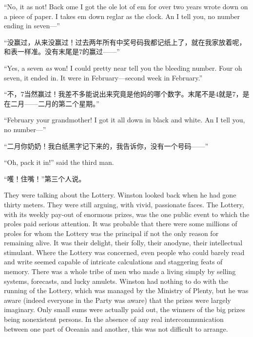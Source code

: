 \begin{paracol}{2}
``No, it \textquotesingle as not! Back \textquotesingle ome I got the
\textquotesingle ole lot of \textquotesingle em for over two years wrote
down on a piece of paper. I takes \textquotesingle em down
reg\textquotesingle lar as the clock. An\textquotesingle{} I tell you,
no number ending in seven---''

\switchcolumn

``没赢过，从来没赢过！过去两年所有中奖号码我都记纸上了，就在我家放着呢，和表一样准。没有末尾是7的赢过——''

\switchcolumn*

``Yes, a seven \emph{\textquotesingle as} won! I could pretty near tell
you the bleeding number. Four oh seven, it ended in. It were in
February---second week in February.''

\switchcolumn

``不，7当然赢过！我差不多能说出来究竟是他妈的哪个数字。末尾不是4就是7，是在二月——二月的第二个星期。''

\switchcolumn*

``February your grandmother! I got it all down in black and white.
An\textquotesingle{} I tell you, no number---''

\switchcolumn

``二月你奶奶！我白纸黑字记下来的，我告诉你，没有一个号码——''

\switchcolumn*

``Oh, pack it in!'' said the third man.

\switchcolumn

``嚄！住嘴！''第三个人说。

\switchcolumn*

They were talking about the Lottery. Winston looked back when he had
gone thirty meters. They were still arguing, with vivid, passionate
faces. The Lottery, with its weekly pay-out of enormous prizes, was the
one public event to which the proles paid serious attention. It was
probable that there were some millions of proles for whom the Lottery
was the principal if not the only reason for remaining alive. It was
their delight, their folly, their anodyne, their intellectual stimulant.
Where the Lottery was concerned, even people who could barely read and
write seemed capable of intricate calculations and staggering feats of
memory. There was a whole tribe of men who made a living simply by
selling systems, forecasts, and lucky amulets. Winston had nothing to do
with the running of the Lottery, which was managed by the Ministry of
Plenty, but he was aware (indeed everyone in the Party was aware) that
the prizes were largely imaginary. Only small sums were actually paid
out, the winners of the big prizes being nonexistent persons. In the
absence of any real intercommunication between one part of Oceania and
another, this was not difficult to arrange.


\end{paracol}
